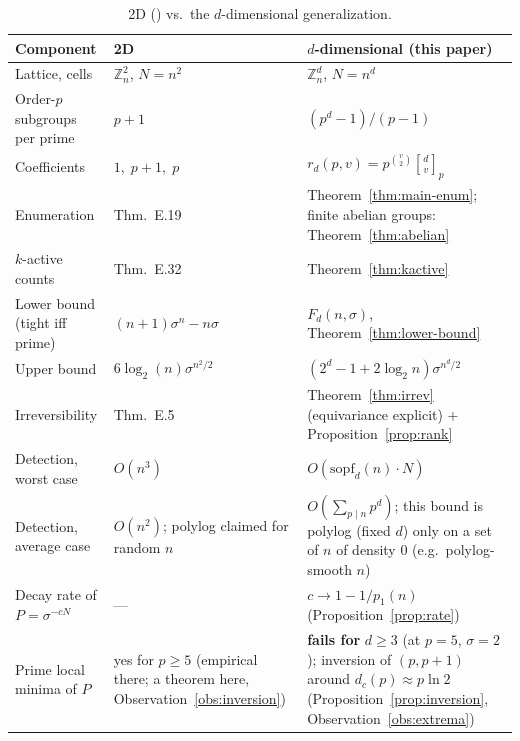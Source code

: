 \documentclass[11pt,a4paper]{article}
\theoremstyle{remark}
\newcommand{\ZZ}{\mathbb{Z}}
\newcommand{\gaussbinom}[2]{\genfrac{[}{]}{0pt}{}{#1}{#2}}
\begin{document}
\begin{table}[ht]
\centering
\caption{2D (\cite{banda2019}) vs.\ the $d$-dimensional generalization.}
\begin{tabular}{p{4.2cm}|p{4.2cm}|p{5.6cm}}
\toprule
\textbf{Component} & \textbf{2D} & \textbf{$d$-dimensional (this paper)} \\
\midrule
Lattice, cells & $\ZZ_n^2$, $N=n^2$ & $\ZZ_n^d$, $N=n^d$ \\
Order-$p$ subgroups per prime & $p+1$ & $(p^d-1)/(p-1)$ \\
Coefficients & $1,\;p{+}1,\;p$ & $r_d(p,v)=p^{\binom v2}\gaussbinom dv_p$ \\
Enumeration & Thm.~E.19 & Theorem~\ref{thm:main-enum}; finite abelian
groups: Theorem~\ref{thm:abelian} \\
$k$-active counts & Thm.~E.32 & Theorem~\ref{thm:kactive} \\
Lower bound (tight iff prime) & $(n{+}1)\sigma^n{-}n\sigma$ &
$F_d(n,\sigma)$, Theorem~\ref{thm:lower-bound} \\
Upper bound & $6\log_2(n)\sigma^{n^2/2}$ &
$(2^d{-}1{+}2\log_2 n)\sigma^{n^d/2}$ \\
Irreversibility & Thm.~E.5 & Theorem~\ref{thm:irrev} (equivariance
explicit) + Proposition~\ref{prop:rank} \\
Detection, worst case & $O(n^3)$ & $O(\mathrm{sopf}_d(n)\cdot N)$ \\
Detection, average case & $O(n^2)$; polylog claimed for random $n$ &
$O(\sum_{p\mid n}p^d)$; this bound is polylog (fixed $d$) only on a set
of $n$ of density $0$ (e.g.\ polylog-smooth $n$) \\
Decay rate of $P=\sigma^{-cN}$ & --- & $c\to1-1/p_1(n)$
(Proposition~\ref{prop:rate}) \\
Prime local minima of $P$ & yes for $p\ge5$ (empirical there; a theorem
here, Observation~\ref{obs:inversion}) & \textbf{fails for }$d\ge3$
(at $p=5$, $\sigma=2$); inversion of $(p,p{+}1)$ around
$d_c(p)\approx p\ln2$
(Proposition~\ref{prop:inversion}, Observation~\ref{obs:extrema}) \\
\bottomrule
\end{tabular}
\end{table}
\end{document}
